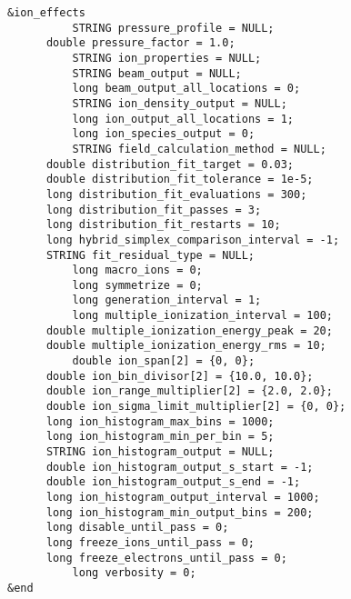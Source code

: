 \documentclass[11pt]{article}
\begin{document}
\begin{verbatim}
&ion_effects
          STRING pressure_profile = NULL;
	  double pressure_factor = 1.0;
          STRING ion_properties = NULL;
          STRING beam_output = NULL;
          long beam_output_all_locations = 0;
          STRING ion_density_output = NULL;
          long ion_output_all_locations = 1;
          long ion_species_output = 0;
          STRING field_calculation_method = NULL;
	  double distribution_fit_target = 0.03;
	  double distribution_fit_tolerance = 1e-5;
	  long distribution_fit_evaluations = 300;
	  long distribution_fit_passes = 3;
	  long distribution_fit_restarts = 10;
	  long hybrid_simplex_comparison_interval = -1;
	  STRING fit_residual_type = NULL;
          long macro_ions = 0;
          long symmetrize = 0;
          long generation_interval = 1;
          long multiple_ionization_interval = 100;
	  double multiple_ionization_energy_peak = 20;
	  double multiple_ionization_energy_rms = 10;
          double ion_span[2] = {0, 0};
	  double ion_bin_divisor[2] = {10.0, 10.0};
	  double ion_range_multiplier[2] = {2.0, 2.0};
	  double ion_sigma_limit_multiplier[2] = {0, 0};
	  long ion_histogram_max_bins = 1000;
	  long ion_histogram_min_per_bin = 5;
	  STRING ion_histogram_output = NULL;
	  double ion_histogram_output_s_start = -1;
	  double ion_histogram_output_s_end = -1;
	  long ion_histogram_output_interval = 1000;
	  long ion_histogram_min_output_bins = 200;
	  long disable_until_pass = 0;
	  long freeze_ions_until_pass = 0;
	  long freeze_electrons_until_pass = 0;
          long verbosity = 0;
&end
\end{verbatim}
\end{document}
